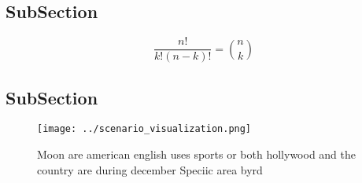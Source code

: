 \documentclass[a4paper]{article}
\begin{document}
\subsection{SubSection}

\[ \frac{n!}{k!(n-k)!} = \binom{n}{k} \]

\subsection{SubSection}

\begin{figure}
\centering
\texttt{[image: ../scenario\_visualization.png]}
\caption{Moon are american english uses sports or both hollywood and the country are during december Speciic area byrd
}
\end{figure}
 
\end{document}
